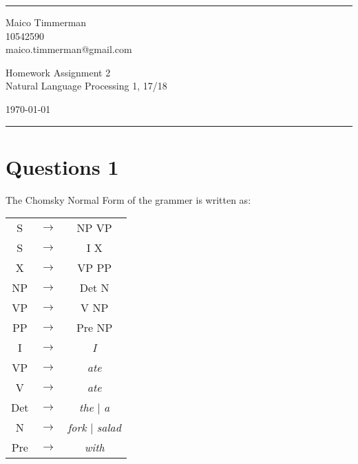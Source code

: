 \documentclass[a4paper]{article}
\begin{document}

\fancyhead[C]{}
\hrule \medskip %
\begin{minipage}{0.295\textwidth}
    \raggedright
    \footnotesize
    Maico Timmerman \hfill\\
    10542590\hfill\\
    maico.timmerman@gmail.com
\end{minipage}
\begin{minipage}{0.4\textwidth}
    \centering
    \large
    Homework Assignment 2\\
    \normalsize
    Natural Language Processing 1, 17/18\\
\end{minipage}
\begin{minipage}{0.295\textwidth}
    \raggedleft
    \today\hfill\\
\end{minipage}
\medskip\hrule
\bigskip


\section*{Questions 1}
The  Chomsky Normal Form of the grammer is written as:

    \begin{table}[h]
        \centering
        \begin{tabular}{ccc}
            S &$\rightarrow$& NP VP\\
            S &$\rightarrow$& I X\\
            X &$\rightarrow$& VP PP\\
            NP &$\rightarrow$& Det N\\
            VP &$\rightarrow$& V NP\\
            PP &$\rightarrow$& Pre NP\\
            I &$\rightarrow$& \textit{I}\\
            VP &$\rightarrow$& \textit{ate}\\
            V &$\rightarrow$& \textit{ate}\\
            Det &$\rightarrow$& \textit{the} | \textit{a}\\
            N &$\rightarrow$& \textit{fork} | \textit{salad}\\
            Pre &$\rightarrow$& \textit{with}
        \end{tabular}
    \end{table}
\end{document}
